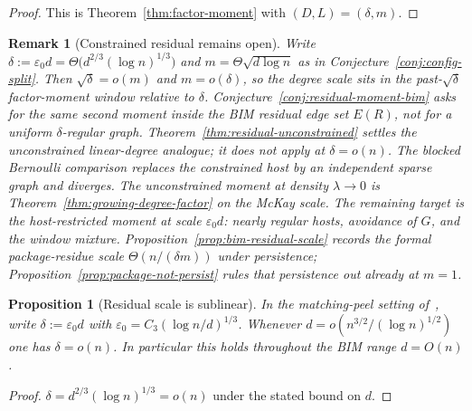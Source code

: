 \documentclass[11pt]{article}
\newtheorem{proposition}[theorem]{Proposition}
\newtheorem{remark}[theorem]{Remark}
\begin{document}
\begin{proof}
This is Theorem~\ref{thm:factor-moment} with \((D,L)=(\delta,m)\).
\end{proof}

\begin{remark}[Constrained residual remains open]
\label{rem:residual-unconstrained}
Write \(\delta:=\varepsilon_0 d=\Theta\bigl(d^{2/3}(\log n)^{1/3}\bigr)\) and
\(m=\Theta\sqrt{d\log n}\) as in Conjecture~\ref{conj:config-split}.
Then \(\sqrt\delta=o(m)\) and \(m=o(\delta)\), so the degree scale sits in the
past-\(\sqrt\delta\) factor-moment window relative to \(\delta\).
Conjecture~\ref{conj:residual-moment-bim} asks for the same second moment inside the
BIM residual edge set \(E(R)\), not for a uniform \(\delta\)-regular graph.
Theorem~\ref{thm:residual-unconstrained} settles the unconstrained
\emph{linear}-degree analogue; it does not apply at \(\delta=o(n)\).
The blocked Bernoulli comparison replaces the constrained host by an
independent sparse graph and diverges. The unconstrained moment at density
\(\lambda\to0\) is Theorem~\ref{thm:growing-degree-factor} on the McKay scale.
The remaining target is the host-restricted moment at scale
\(\varepsilon_0 d\): nearly regular hosts, avoidance of \(G\), and the window
mixture.
Proposition~\ref{prop:bim-residual-scale} records the formal package-residue
scale \(\Theta(n/(\delta m))\) under persistence; Proposition~\ref{prop:package-not-persist}
rules that persistence out already at \(m=1\).
\end{remark}

\begin{proposition}[Residual scale is sublinear]
\label{prop:residual-sublinear}
In the matching-peel setting of~\cite{PlusOneV1}, write
\(\delta:=\varepsilon_0 d\) with \(\varepsilon_0=C_3(\log n/d)^{1/3}\).
Whenever \(d=o(n^{3/2}/(\log n)^{1/2})\) one has \(\delta=o(n)\). In particular
this holds throughout the BIM range \(d=O(n)\).
\end{proposition}

\begin{proof}
\(\delta=d^{2/3}(\log n)^{1/3}=o(n)\) under the stated bound on \(d\).
\end{proof}
\end{document}

